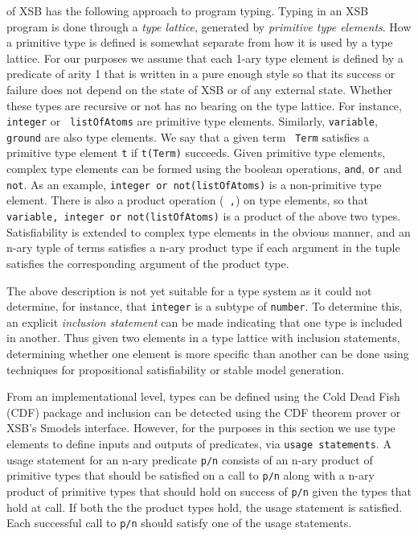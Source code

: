 \version{} of XSB has the following approach to program typing.
Typing in an XSB program is done through a {\em type lattice},
generated by {\em primitive type elements}.  How a primitive type is
defined is somewhat separate from how it is used by a type lattice.
For our purposes we assume that each 1-ary type element is defined by
a predicate of arity 1 that is written in a pure enough style so that
its success or failure does not depend on the state of XSB or of any
external state.  Whether these types are recursive or not has no
bearing on the type lattice.  For instance, {\tt integer} or {\tt
listOfAtoms} are primitive type elements.  Similarly, {\tt variable},
{\tt ground} are also type elements.  We say that a given term {\tt
Term} satisfies a primitive type element {\tt t} if {\tt t(Term)}
succeeds.  Given primitive type elements, complex type elements can be
formed using the boolean operations, {\tt and}, {\tt or} and {\tt
not}.  As an example, {\tt integer or not(listOfAtoms)} is a
non-primitive type element.  There is also a product operation ({\tt
,}) on type elements, so that {\tt variable, integer or
not(listOfAtoms)} is a product of the above two types.  
Satisfiability is extended to complex type elements in the obvious
manner, and an n-ary typle of terms satisfies a n-ary product type if
each argument in the tuple satisfies the corresponding argument of the
product type.

The above description is not yet suitable for a type system as it
could not determine, for instance, that {\tt integer} is a subtype of
{\tt number}.  To determine this, an explicit {\em inclusion
statement} can be made indicating that one type is included in
another.  Thus given two elements in a type lattice with inclusion
statements, determining whether one element is more specific than
another can be done using techniques for propositional satisfiability
or stable model generation.

From an implementational level, types can be defined using the Cold
Dead Fish (CDF) package and inclusion can be detected using the CDF
theorem prover or XSB's Smodels interface.  However, for the
purposes in this section we use type elements to define inputs and
outputs of predicates, via {\tt usage statements}.  A usage statement
for an n-ary predicate {\tt p/n} consists of an n-ary product of
primitive types that should be satisfied on a call to {\tt p/n} along
with a n-ary product of primitive types that should hold on success of
{\tt p/n} given the types that hold at call.  If both the the product
types hold, the usage statement is satisfied.  Each successful call to
{\tt p/n} should satisfy one of the usage statements.


